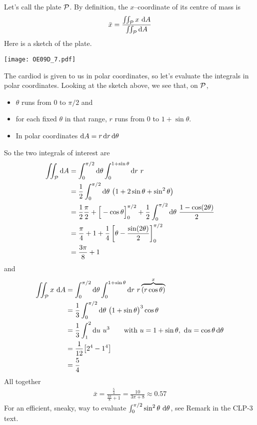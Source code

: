 \begin{solution}
Let's call the plate $\mathcal{P}$. By definition, the $x$--coordinate of its 
centre of mass is
\begin{align*}
\bar x = \frac{\iint_{\mathcal{P}} x\ \mathrm{d}A}{\iint_{\mathcal{P}}\mathrm{d}A}
\end{align*}
Here is a sketch of the plate.
\begin{center}
     \texttt{[image: OE09D\_7.pdf]}
\end{center}
The cardiod is given to us in polar coordinates, so let's evaluate the
integrals in polar coordinates. Looking at the sketch above, we see that,
on $\mathcal{P}$,
\begin{itemize}
\item
$\theta$ runs from $0$ to $\pi/2$ and
\item
for each fixed $\theta$ in that range, $r$ runs from $0$
to $1+\sin\theta$.
\item
In polar coordinates $\mathrm{d}A = r\,\mathrm{d}r\,\mathrm{d}\theta$
\end{itemize}
So the two integrals of interest are
\begin{align*}
\iint_{\mathcal{P}}\mathrm{d}A
&=\int_0^{\pi/2}\mathrm{d}\theta\int_0^{1+\sin\theta}\mathrm{d}r\ r \\
&=\frac{1}{2} \int_0^{\pi/2}\mathrm{d}\theta\ \big(1+2\sin\theta +\sin^2\theta\big)\\
&=\frac{1}{2}\frac{\pi}{2} +\Big[-\cos\theta\Big]_0^{\pi/2}
+\frac{1}{2} \int_0^{\pi/2}\mathrm{d}\theta\ \frac{1-\cos(2\theta)}{2} \\
&=\frac{\pi}{4} + 1 
    +\frac{1}{4}\left[\theta-\frac{\sin(2\theta)}{2}\right]_0^{\pi/2} \\
&=\frac{3\pi}{8} + 1
\end{align*}
and
\begin{align*}
\dblInt_\cP x\ \dee{A}
&=\int_0^{\pi/2}\dee{\theta}\int_0^{1+\sin\theta}\dee{r}\ r
   \overbrace{(r\cos\theta)}^{x} \\
&=\frac{1}{3} \int_0^{\pi/2}\dee{\theta}\ \big(1+\sin\theta\big)^3\cos\theta\\
&=\frac{1}{3}\int_1^2\dee{u}\ u^3\qquad\text{with }u=1+\sin\theta,\ 
                                       \dee{u} = \cos\theta\,\dee{\theta}  \\
&=\frac{1}{12}\big[2^4-1^4\big] \\
&=\frac{5}{4}
\end{align*}
All together
\begin{align*}
\bar x = \frac{\frac{5}{4}}{\frac{3\pi}{8} + 1}
=\frac{10}{3\pi+8}
\approx 0.57
\end{align*}
For an efficient, sneaky, way to evaluate  
$\int_0^{\pi/2}\sin^2\theta\ \dee{\theta}$,
see Remark  in the CLP-3 text.
\end{solution}

